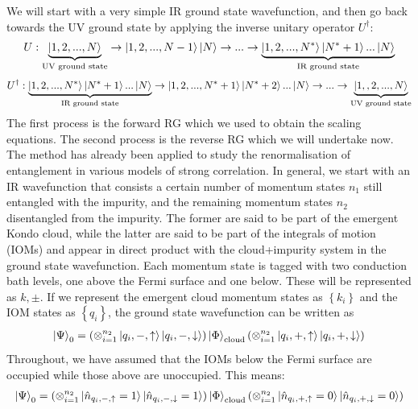 We will start with a very simple IR ground state wavefunction, and then go back towards the UV ground state by applying the inverse unitary operator \(U^\dagger\):
\begin{equation*}\begin{aligned}
	U : \underbrace{\ket{1,2,...,N}}_\text{UV ground state} \rightarrow \ket{1,2,...,N-1}\ket{N} \rightarrow ... \rightarrow \underbrace{\ket{1,2,...,N^*}\ket{N^*+1}...\ket{N}}_\text{IR ground state}
\end{aligned}\end{equation*}
\begin{equation*}\begin{aligned}
	U^\dagger : \underbrace{\ket{1,2,...,N^*}\ket{N^*+1}...\ket{N}}_\text{IR ground state} \rightarrow \ket{1,2,...,N^*+1}\ket{N^*+2}...\ket{N} \rightarrow ... \rightarrow\underbrace{\ket{1,,2,...,N}}_\text{UV ground state}
\end{aligned}\end{equation*}
The first process is the forward RG which we used to obtain the scaling equations.
The second process is the reverse RG which we will undertake now. The method has already been applied to study the renormalisation of entanglement in various models of strong correlation.
In general, we start with an IR wavefunction that consists a certain number of momentum states \(n_1\) still entangled with the impurity, and the remaining momentum states \(n_2\) disentangled from the impurity.
The former are said to be part of the emergent Kondo cloud, while the latter are said to be part of the integrals of motion (IOMs) and appear in direct product with the cloud+impurity system in the ground state wavefunction.
Each momentum state is tagged with two conduction bath levels, one above the Fermi surface and one below.
These will be represented as \(k,\pm\). If we represent the emergent cloud momentum states as \(\left\{k_i\right\} \) and the IOM states as \(\left\{q_i\right\}\), the ground state wavefunction can be written as 
\begin{equation}\begin{aligned}
	\ket{\Psi}_0 = \left(\otimes_{i=1}^{n_2}\ket{q_i,-,\uparrow}\ket{q_i,-,\downarrow}\right)\ket{\Phi}_\text{cloud}\left(\otimes_{i=1}^{n_2}\ket{q_i,+,\uparrow}\ket{q_i,+,\downarrow}\right)
\end{aligned}\end{equation}
Throughout, we have assumed that the IOMs below the Fermi surface are occupied while those above are unoccupied. This means:
\begin{equation}\begin{aligned}
	\ket{\Psi}_0 = \left(\otimes_{i=1}^{n_2}\ket{\hat n_{q_i,-,\uparrow}=1}\ket{\hat n_{q_i,-,\downarrow}=1}\right)\ket{\Phi}_\text{cloud}\left(\otimes_{i=1}^{n_2}\ket{\hat n_{q_i,+,\uparrow}=0}\ket{\hat n_{q_i,+,\downarrow}=0}\right)
\end{aligned}\end{equation}
